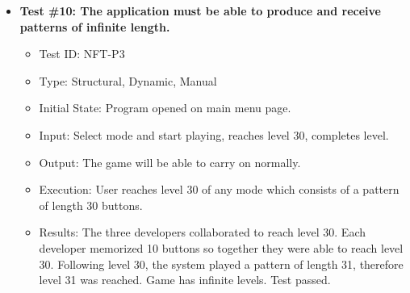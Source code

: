 \documentclass[12pt, titlepage]{article}
\begin{document}
\begin{itemize}
\item \textbf{Test \#10: The application must be able to produce and receive patterns of infinite length.}
\begin{itemize}
\item Test ID: NFT-P3
\item Type: Structural, Dynamic, Manual				
\item Initial State: Program opened on main menu page.		
\item Input: Select mode and start playing, reaches level 30, completes level.
\item Output: The game will be able to carry on normally.
\item Execution: User reaches level 30 of any mode which consists of a pattern of length 30 buttons.
\item Results: The three developers collaborated to reach level 30. Each developer memorized 10 buttons so together they were able to reach level 30. Following level 30, the system played a pattern of length 31, therefore level 31 was reached. Game has infinite levels. Test passed.
\end{itemize}
\end{itemize}
\end{document}
